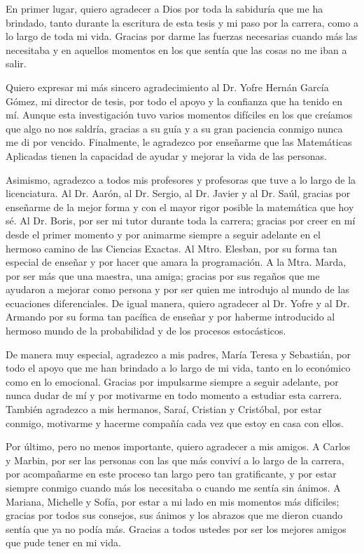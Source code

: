 \documentclass[
  spanish,
  us-letterpaper,
]{scrreprt}
\numberwithin{equation}{section}
\theoremstyle{plain}
\theoremstyle{plain}
\theoremstyle{plain}
\theoremstyle{definition}
\theoremstyle{remark}
\begin{document}
En primer lugar, quiero agradecer a Dios por toda la sabiduría que me ha brindado, tanto durante la escritura de esta tesis y mi paso por la carrera, como a lo largo de toda mi vida. Gracias por darme las fuerzas necesarias cuando más las necesitaba y en aquellos momentos en los que sentía que las cosas no me iban a salir.

Quiero expresar mi más sincero agradecimiento al Dr. Yofre Hernán García Gómez, mi director de tesis, por todo el apoyo y la confianza que ha tenido en mí. Aunque esta investigación tuvo varios momentos difíciles en los que creíamos que algo no nos saldría, gracias a su guía y a su gran paciencia conmigo nunca me di por vencido. Finalmente, le agradezco por enseñarme que las Matemáticas Aplicadas tienen la capacidad de ayudar y mejorar la vida de las personas.

Asimismo, agradezco a todos mis profesores y profesoras que tuve a lo largo de la licenciatura. Al Dr. Aarón, al Dr. Sergio, al Dr. Javier y al Dr. Saúl, gracias por enseñarme de la mejor forma y con el mayor rigor posible la matemática que hoy sé. Al Dr. Boris, por ser mi tutor durante toda la carrera; gracias por creer en mí desde el primer momento y por animarme siempre a seguir adelante en el hermoso camino de las Ciencias Exactas. Al Mtro. Elesban, por su forma tan especial de enseñar y por hacer que amara la programación. A la Mtra. Marda, por ser más que una maestra, una amiga; gracias por sus regaños que me ayudaron a mejorar como persona y por ser quien me introdujo al mundo de las ecuaciones diferenciales. De igual manera, quiero agradecer al Dr. Yofre y al Dr. Armando por su forma tan pacífica de enseñar y por haberme introducido al hermoso mundo de la probabilidad y de los procesos estocásticos.

De manera muy especial, agradezco a mis padres, María Teresa y Sebastián, por todo el apoyo que me han brindado a lo largo de mi vida, tanto en lo económico como en lo emocional. Gracias por impulsarme siempre a seguir adelante, por nunca dudar de mí y por motivarme en todo momento a estudiar esta carrera. También agradezco a mis hermanos, Saraí, Cristian y Cristóbal, por estar conmigo, motivarme y hacerme compañía cada vez que estoy en casa con ellos.

Por último, pero no menos importante, quiero agradecer a mis amigos. A Carlos y Marbin, por ser las personas con las que más conviví a lo largo de la carrera, por acompañarme en este proceso tan largo pero tan gratificante, y por estar siempre conmigo cuando más los necesitaba o cuando me sentía sin ánimos. A Mariana, Michelle y Sofía, por estar a mi lado en mis momentos más difíciles; gracias por todos sus consejos, sus ánimos y los abrazos que me dieron cuando sentía que ya no podía más. Gracias a todos ustedes por ser los mejores amigos que pude tener en mi vida.
\end{document}
